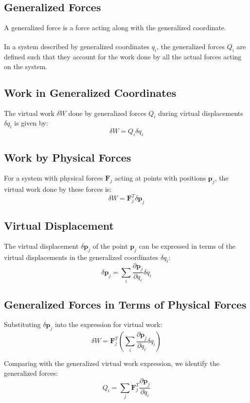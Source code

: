\subsection{Generalized Forces}
A generalized force is a force acting along with the generalized coordinate.
\\
\\
In a system described by generalized coordinates $q_i$, the generalized forces $Q_i$ are defined such that they account for the work done by all the actual forces acting on the system.
\subsection{Work in Generalized Coordinates}
The virtual work \( \delta W \) done by generalized forces \( Q_i \) during virtual displacements \( \delta q_i \) is given by:
\[
\delta W =  Q_i \delta q_i
\]


\subsection{Work by Physical Forces}
For a system with physical forces \( \mathbf{F}_j \) acting at points with positions \( \mathbf{p}_j \), the virtual work done by these forces is:
\[
\delta W = \mathbf{F}_j^T \delta \mathbf{p}_j
\]


\subsection{Virtual Displacement}
The virtual displacement \( \delta \mathbf{p}_j \) of the point \( \mathbf{p}_j \) can be expressed in terms of the virtual displacements in the generalized coordinates \( \delta q_i \):
\[
\delta \mathbf{p}_j = \sum_{i} \frac{\partial \mathbf{p}_j}{\partial q_i} \delta q_i
\]

\subsection{Generalized Forces in Terms of Physical Forces}
Substituting \( \delta \mathbf{p}_j \) into the expression for virtual work:
\[
\delta W = \mathbf{F}_j^T \left( \sum_{i} \frac{\partial \mathbf{p}_j}{\partial q_i} \delta q_i \right)
\]

Comparing with the generalized virtual work expression, we identify the generalized forces:
\[
Q_i = \sum_{j} \mathbf{F}_j^T \frac{\partial \mathbf{p}_j}{\partial q_i}
\]
